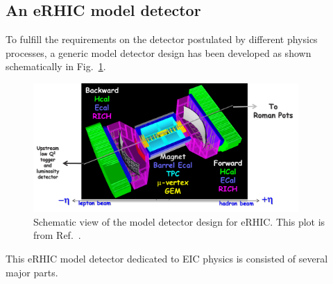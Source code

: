 \subsection{An eRHIC model detector}
To fulfill the requirements on the detector postulated by different physics processes, 
a generic model detector design has been developed as shown schematically in Fig.~\ref{fig:detector_eRHIC}.
\begin{figure}
\centering
\includegraphics[width=0.9\textwidth]{plots/chpt4/eRHIC_model_detector_2.png}
\caption[A schematic view of the eRHIC detector design]{
Schematic view of the model detector design for eRHIC. This plot is from Ref.~\cite{Aschenauer:2014a}.}
\label{fig:detector_eRHIC}
\end{figure}

This eRHIC model detector dedicated to EIC physics is consisted of several major parts.

